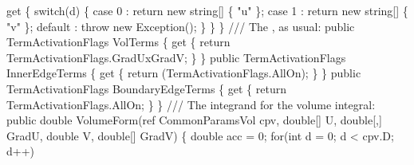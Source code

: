 {\btab \btab get \{ \newline 
\btab \btab \btab switch(d) \{\newline 
\btab \btab \btab \btab case 0  : return new string[] \{ "u" \}; \newline 
\btab \btab \btab \btab case 1  : return new string[] \{ "v" \}; \newline 
\btab \btab \btab \btab default : throw new Exception();\newline 
\btab \btab \btab \}\newline 
\btab \btab \} \newline 
\btab \}\newline 
 \newline 
    /// The , as usual:
\btab public TermActivationFlags VolTerms \{\newline 
\btab \btab get \{\newline 
\btab \btab \btab return TermActivationFlags.GradUxGradV;\newline 
\btab \btab \}\newline 
\btab \}\newline 
 \newline 
\btab public TermActivationFlags InnerEdgeTerms \{\newline 
\btab \btab get \{\newline 
\btab \btab \btab return (TermActivationFlags.AllOn);\newline 
\btab \btab \}\newline 
\btab \}\newline 
 \newline 
\btab public TermActivationFlags BoundaryEdgeTerms \{\newline 
\btab    get \{\newline 
\btab \btab    return TermActivationFlags.AllOn;\newline 
\btab \btab \}\newline 
\btab \}\newline 
 \newline 
    /// The integrand for the volume integral:
\btab public double VolumeForm(ref CommonParamsVol cpv, \newline 
\btab \btab    double[] U, double[,] GradU,\newline 
\btab \btab    double V, double[] GradV) \{               \newline 
\btab \btab double acc = 0;\newline 
\btab \btab for(int d = 0; d < cpv.D; d++)\newline 
}
